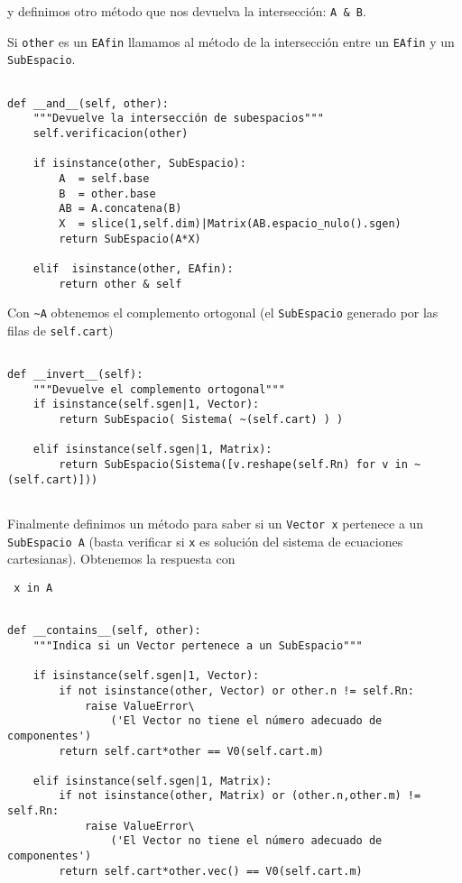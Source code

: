 \documentclass[11pt]{report}
\begin{document}
y definimos otro método que nos devuelva la intersección: \texttt{A \& B}. 

Si \texttt{other} es un \texttt{EAfin} llamamos al método de la intersección entre
un \texttt{EAfin} y un \texttt{SubEspacio}.


\begin{verbatim}

def __and__(self, other):
    """Devuelve la intersección de subespacios"""
    self.verificacion(other)
    
    if isinstance(other, SubEspacio):
        A  = self.base
        B  = other.base
        AB = A.concatena(B)
        X  = slice(1,self.dim)|Matrix(AB.espacio_nulo().sgen)
        return SubEspacio(A*X)
    
    elif  isinstance(other, EAfin):
        return other & self

\end{verbatim}

Con \texttt{\textasciitilde{}A} obtenemos el complemento ortogonal (el \texttt{SubEspacio} generado
por las filas de \texttt{self.cart})


\begin{verbatim}

def __invert__(self):
    """Devuelve el complemento ortogonal"""
    if isinstance(self.sgen|1, Vector):
        return SubEspacio( Sistema( ~(self.cart) ) )
    
    elif isinstance(self.sgen|1, Matrix):
        return SubEspacio(Sistema([v.reshape(self.Rn) for v in ~(self.cart)]))
    
\end{verbatim}

\noindent Finalmente definimos un método para saber si un \texttt{Vector x}
pertenece a un \texttt{SubEspacio A} (basta verificar si \texttt{x} es solución del
sistema de ecuaciones cartesianas). Obtenemos la respuesta con
\begin{center}
  \Verb/ x in A /
\end{center}


\begin{verbatim}

def __contains__(self, other):
    """Indica si un Vector pertenece a un SubEspacio"""

    if isinstance(self.sgen|1, Vector):
        if not isinstance(other, Vector) or other.n != self.Rn:
            raise ValueError\
                ('El Vector no tiene el número adecuado de componentes')
        return self.cart*other == V0(self.cart.m)
    
    elif isinstance(self.sgen|1, Matrix):
        if not isinstance(other, Matrix) or (other.n,other.m) != self.Rn:
            raise ValueError\
                ('El Vector no tiene el número adecuado de componentes')        
        return self.cart*other.vec() == V0(self.cart.m)
    

\end{verbatim}
\end{document}
